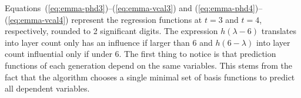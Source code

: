 Equations~(\ref{eq:emma-phd3})--(\ref{eq:emma-vcal3}) and (\ref{eq:emma-phd4})--(\ref{eq:emma-vcal4}) represent the regression functions at $t=3$ and $t=4$, respectively, rounded to 2 significant digits.
The expression $h(\lambda-6)$ translates into layer count only has an influence if larger than 6 
and $h(6-\lambda)$ into layer count influential only if under 6.
%
The first thing to notice is that prediction functions of each generation depend on the same variables. 
This stems from the fact that the algorithm chooses a single minimal set of basis functions to predict all dependent variables. 
%

